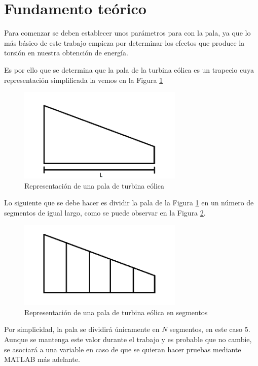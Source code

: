 \section{Fundamento teórico}

Para comenzar se deben establecer unos parámetros para con la pala, ya que lo más básico de este trabajo empieza por determinar los efectos que produce la torsión en nuestra obtención de energía.

Es por ello que se determina que la pala de la turbina eólica es un trapecio cuya representación simplificada la vemos en la Figura \ref{fig:pala_simp}

\begin{figure}[H]
    \centering
    \includegraphics[width=0.7\textwidth]{images/pala turbina paint.png}
    \caption{Representación de una pala de turbina eólica}
    \label{fig:pala_simp}
\end{figure}


Lo siguiente que se debe hacer es dividir la pala de la Figura \ref{fig:pala_simp} en un número de segmentos de igual largo, como se puede observar en la Figura \ref{fig:pala_dividida}.
    \textbf{}
    \begin{figure}[H]
    \centering
    \includegraphics[width=0.7\textwidth]{images/pala dividida.png}
    \caption{Representación de una pala de turbina eólica en segmentos}
    \label{fig:pala_dividida}
\end{figure}

Por simplicidad, la pala se dividirá únicamente en $N$ segmentos, en este caso 5. Aunque se mantenga este valor durante el trabajo y es probable que no cambie, se asociará a una variable en caso de que se quieran hacer pruebas mediante MATLAB más adelante.
    
